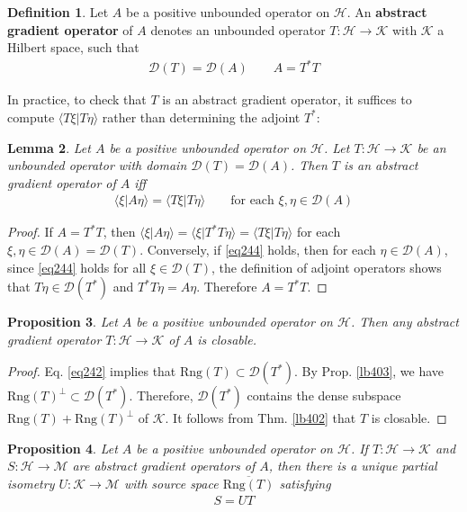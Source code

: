 \documentclass[12pt,b5paper,notitlepage]{article}
\theoremstyle{definition}
\newtheorem{df}{Definition}[subsection]
\theoremstyle{plain}
\newtheorem{pp}[df]{Proposition}
\newtheorem{lm}[df]{Lemma}
\newcommand{\ovl}{\overline}
\newcommand{\Dom}{\mathscr{D}}
\newcommand{\bk}[1]{\langle {#1}\rangle}
\newcommand{\Rng}{\mathrm{Rng}}
\newcommand{\MH}{\mathcal H}
\newcommand{\MK}{\mathcal K}
\newcommand{\MM}{\mathcal M}
\numberwithin{equation}{section}
\begin{document}
\begin{df}
Let $A$ be a positive unbounded operator on $\MH$. An \textbf{abstract gradient operator}  of $A$ denotes an unbounded operator $T:\MH\rightarrow\MK$ with $\MK$ a Hilbert space, such that
\begin{align}\label{eq242}
\Dom(T)=\Dom(A)\qquad A=T^*T
\end{align} 
\end{df}


In practice, to check that $T$ is an abstract gradient operator, it suffices to compute $\bk{T\xi|T\eta}$ rather than determining the adjoint $T^*$:

\begin{lm}\label{lb466}
Let $A$ be a positive unbounded operator on $\MH$. Let $T:\MH\rightarrow\MK$ be an unbounded operator with domain $\Dom(T)=\Dom(A)$. Then $T$ is an abstract gradient operator of $A$ iff
\begin{align}\label{eq244}
\bk{\xi|A\eta}=\bk{T\xi|T\eta}\qquad\text{for each }\xi,\eta\in\Dom(A)
\end{align}
\end{lm}

\begin{proof}
If $A=T^*T$, then $\bk{\xi|A\eta}=\bk{\xi|T^*T\eta}=\bk{T\xi|T\eta}$ for each $\xi,\eta\in\Dom(A)=\Dom(T)$. Conversely, if \eqref{eq244} holds, then for each $\eta\in\Dom(A)$, since \eqref{eq244} holds for all $\xi\in\Dom(T)$, the definition of adjoint operators shows that $T\eta\in\Dom(T^*)$ and $T^*T\eta=A\eta$. Therefore $A=T^*T$.
\end{proof}




\begin{pp}\label{lb468}
Let $A$ be a positive unbounded operator on $\MH$. Then any abstract gradient operator $T:\MH\rightarrow\MK$ of $A$ is closable.
\end{pp}


\begin{proof}
Eq. \eqref{eq242} implies that $\Rng(T)\subset\Dom(T^*)$. By Prop. \ref{lb403}, we have $\Rng(T)^\perp\subset\Dom(T^*)$. Therefore, $\Dom(T^*)$ contains the dense subspace $\Rng(T)+\Rng(T)^\perp$ of $\MK$. It follows from Thm. \ref{lb402} that $T$ is closable.
\end{proof}



\begin{pp}\label{lb469}
Let $A$ be a positive unbounded operator on $\MH$. If $T:\MH\rightarrow\MK$ and $S:\MH\rightarrow\MM$ are abstract gradient operators of $A$, then there is a unique partial isometry $U:\MK\rightarrow\MM$ with source space $\ovl{\Rng(T)}$ satisfying
\begin{align*}
S=UT
\end{align*}
\end{pp}
\end{document}
